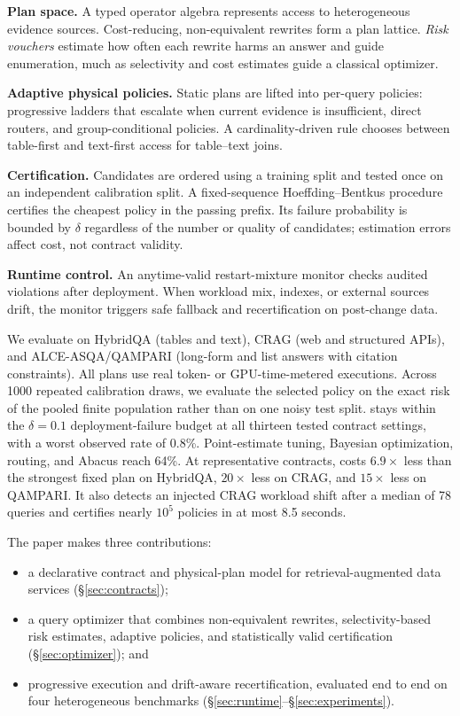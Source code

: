 \textbf{Plan space.} A typed operator algebra represents access to
heterogeneous evidence sources. Cost-reducing, non-equivalent rewrites form
a plan lattice. \emph{Risk vouchers} estimate how often each rewrite harms
an answer and guide enumeration, much as selectivity and cost estimates
guide a classical optimizer.

\textbf{Adaptive physical policies.} Static plans are lifted into
per-query policies: progressive ladders that escalate when current evidence
is insufficient, direct routers, and group-conditional policies. A
cardinality-driven rule chooses between table-first and text-first access
for table--text joins.

\textbf{Certification.} Candidates are ordered using a training split and
tested once on an independent calibration split. A fixed-sequence
Hoeffding--Bentkus procedure certifies the cheapest policy in the passing
prefix. Its failure probability is bounded by $\delta$ regardless of the
number or quality of candidates; estimation errors affect cost, not
contract validity.

\textbf{Runtime control.} An anytime-valid restart-mixture monitor checks
audited violations after deployment. When workload mix, indexes, or
external sources drift, the monitor triggers safe fallback and
recertification on post-change data.

We evaluate \system on HybridQA (tables and text), CRAG (web and structured
APIs), and ALCE-ASQA/QAMPARI (long-form and list answers with citation
constraints). All plans use real token- or GPU-time-metered executions.
Across 1000 repeated calibration draws, we evaluate the selected policy on
the exact risk of the pooled finite population rather than on one noisy
test split. \system stays within the $\delta=0.1$ deployment-failure budget
at all thirteen tested contract settings, with a worst observed rate of
0.8\%. Point-estimate tuning, Bayesian optimization, routing, and Abacus
reach 64\%. At representative contracts, \system costs
$6.9\times$ less than the strongest fixed plan on HybridQA,
$20\times$ less on CRAG, and $15\times$ less on QAMPARI. It also detects
an injected CRAG workload shift after a median of 78 queries and certifies
nearly $10^5$ policies in at most 8.5 seconds.

The paper makes three contributions:
\begin{itemize}
  \item a declarative contract and physical-plan model for
  retrieval-augmented data services (\S\ref{sec:contracts});
  \item a query optimizer that combines non-equivalent rewrites,
  selectivity-based risk estimates, adaptive policies, and statistically
  valid certification (\S\ref{sec:optimizer}); and
  \item progressive execution and drift-aware recertification, evaluated
  end to end on four heterogeneous benchmarks
  (\S\ref{sec:runtime}--\S\ref{sec:experiments}).
\end{itemize}
